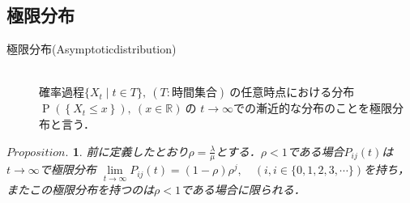 \documentclass[a4j,papersize,disablejfam,slide,14pt]{jsarticle}
\newtheorem{Prop}{$Proposition.$}
\def\prob#1{\operatorname{P} \left(\left\{ #1 \right\}\right)} %
\begin{document}
\subsection{極限分布}
    \begin{screen}
    	\begin{description}
        	\item[極限分布{\rm (Asymptotic\quad distribution)}]\mbox{}\\
            	確率過程$\{ X_t \mid t \in T \},\ (T:\mbox{時間集合})\ $の任意時点における分布$\prob{X_t \leq x},\ (x \in \mathbb{R})\ $の
                $t \to \infty$での漸近的な分布のことを極限分布と言う．
        \end{description}
    \end{screen}
    \begin{screen}
    	\begin{Prop}
        \label{Prop:asymptotic_dist}
        	前に定義したとおり$\rho=\frac{\lambda}{\mu}$とする．$\rho < 1$である場合$P_{ij}(t)$は$t \to \infty$で極限分布
            $\lim\limits_{t \to \infty} P_{ij}(t) = (1-\rho)\rho^j, \quad (i,i \in \{ 0,1,2,3,\cdots \})$を持ち，またこの極限分布を持つのは$\rho < 1$である場合に限られる．
        \end{Prop}
    \end{screen}
\end{document}
